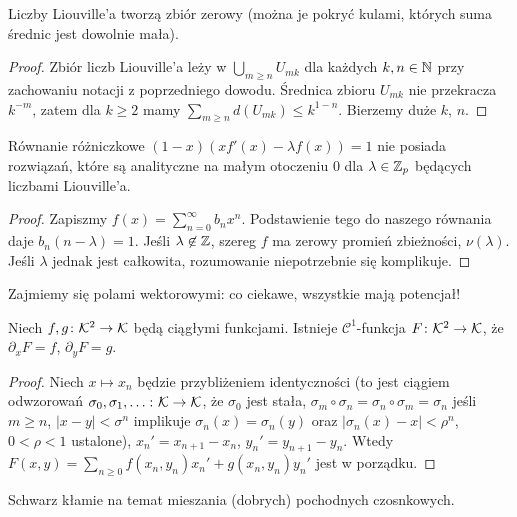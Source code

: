 \begin{fakt}
	Liczby Liouville'a tworzą zbiór zerowy (można je pokryć kulami, których suma średnic jest dowolnie mała).
\end{fakt}

\begin{proof}
	Zbiór liczb Liouville'a leży w $\bigcup_{m \ge n} U_{mk}$ dla każdych $k, n \in \mathbb N$ przy zachowaniu notacji z poprzedniego dowodu.
	Średnica zbioru $U_{mk}$ nie przekracza $k^{-m}$, zatem dla $k \ge 2$ mamy $\sum_{m \ge n} d(U_{mk}) \le k^{1-n}$.
	Bierzemy duże $k$, $n$.
\end{proof}

\begin{fakt}
	Równanie różniczkowe $(1-x)(x f'(x) - \lambda f(x)) = 1$ nie posiada rozwiązań, które są analityczne na małym otoczeniu $0$ dla $\lambda \in \mathbb Z_p$ będących liczbami Liouville'a.
\end{fakt}

\begin{proof}
	Zapiszmy $f(x) = \sum_{n=0}^\infty b_n x^n$.
	Podstawienie tego do naszego równania daje $b_n (n - \lambda ) = 1$.
	Jeśli $\lambda \not \in \mathbb Z$, szereg $f$ ma zerowy promień zbieżności, $\nu(\lambda)$.
	Jeśli $\lambda$ jednak jest całkowita, rozumowanie niepotrzebnie się komplikuje.
\end{proof}

Zajmiemy  się polami wektorowymi: co ciekawe, wszystkie mają potencjał!

\begin{fakt}
	Niech $f, g \colon \mathcal K^2 \to \mathcal K$ będą ciągłymi funkcjami.
	Istnieje $\mathcal C^1$-funkcja $F \colon \mathcal K^2 \to \mathcal K$, że $\partial_x F = f$, $\partial_y F = g$.
\end{fakt}

\begin{proof}
	Niech $x \mapsto x_n$ będzie przybliżeniem identyczności (to jest ciągiem odwzorowań $\sigma_0, \sigma_1, \ldots \colon \mathcal K \to \mathcal K$, że $\sigma_0$ jest stała, $\sigma_m \circ \sigma_n = \sigma_n \circ \sigma_m = \sigma_n$ jeśli $m \ge n$, $|x - y| < \sigma^n$ implikuje $\sigma_n(x) = \sigma_n(y)$ oraz $|\sigma_n(x) - x| < \rho^n$, $0 < \rho < 1$ ustalone), $x_n' = x_{n+1} - x_n$, $y_n' = y_{n+1} - y_n$. 
	Wtedy $F(x, y) = \sum_{n \ge 0} f(x_n, y_n)x_n' +g(x_n, y_n)y_n'$ jest w porządku.
\end{proof}

Schwarz kłamie na temat mieszania (dobrych) pochodnych czosnkowych.

